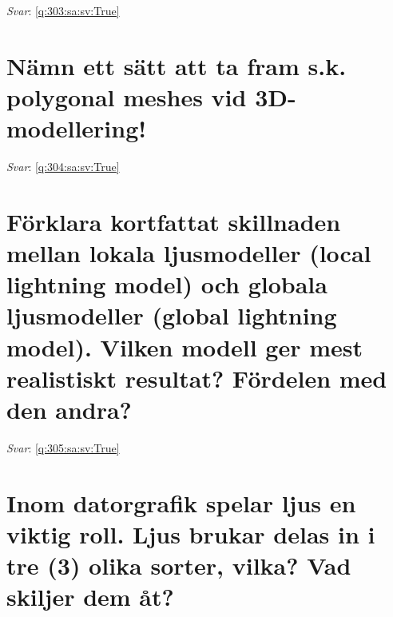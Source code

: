 \documentclass[a4paper,11pt,oneside]{book}
\begin{document}
\begin{sloppypar}
\label{q:303:sa:sv:False}

\vspace{2cm}

\noindent\makebox[\textwidth]{\hrulefill}

\vspace{1cm}

\textit{Svar}: \autoref{q:303:sa:sv:True}



\section{N\"amn ett s\"att att ta fram s.k. polygonal meshes vid 3D-modellering!}

\label{q:304:sa:sv:False}

\vspace{2cm}

\noindent\makebox[\textwidth]{\hrulefill}

\vspace{1cm}

\textit{Svar}: \autoref{q:304:sa:sv:True}



\section{F\"orklara kortfattat skillnaden mellan lokala ljusmodeller (local lightning model) och globala ljusmodeller (global lightning model). Vilken modell ger mest realistiskt resultat? F\"ordelen med den andra?}

\label{q:305:sa:sv:False}

\vspace{2cm}

\noindent\makebox[\textwidth]{\hrulefill}

\vspace{1cm}

\textit{Svar}: \autoref{q:305:sa:sv:True}



\section{Inom datorgrafik spelar ljus en viktig roll. Ljus brukar delas in i tre (3) olika sorter, vilka? Vad skiljer dem \r{a}t?}

\label{q:306:sa:sv:False}

\vspace{2cm}

\noindent\makebox[\textwidth]{\hrulefill}


\end{sloppypar}
\end{document}
